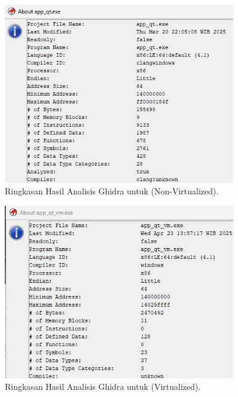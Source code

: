 \begin{figure}[H]
    \centering
    \includegraphics[width=0.9\textwidth]{assets/pics/app_qt_summary_result.jpeg} %
    \caption{Ringkasan Hasil Analisis Ghidra untuk  (Non-Virtualized).}
    \label{fig:ghidra_summary_qt}
\end{figure}

\begin{figure}[H]
    \centering
    \includegraphics[width=0.9\textwidth]{assets/pics/app_qt_vm_summary_result.jpeg} %
    \caption{Ringkasan Hasil Analisis Ghidra untuk  (Virtualized).}
    \label{fig:ghidra_summary_qt_vm}
\end{figure}

